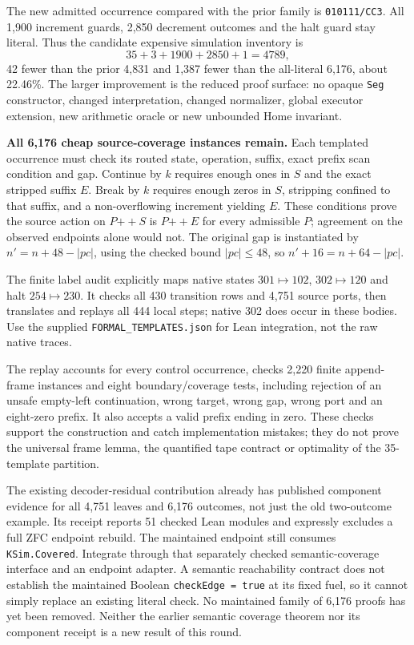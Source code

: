\documentclass[11pt]{article}
\newcommand{\code}[1]{\texttt{#1}}
\begin{document}
The new admitted occurrence compared with the prior family is \code{010111/CC3}. All 1,900 increment guards, 2,850 decrement outcomes and the halt guard stay literal. Thus the candidate expensive simulation inventory is
\[
 35+3+1900+2850+1=4789,
\]
42 fewer than the prior 4,831 and 1,387 fewer than the all-literal 6,176, about 22.46\%. The larger improvement is the reduced proof surface: no opaque \code{Seg} constructor, changed interpretation, changed normalizer, global executor extension, new arithmetic oracle or new unbounded Home invariant.

\textbf{All 6,176 cheap source-coverage instances remain.} Each templated occurrence must check its routed state, operation, suffix, exact prefix scan condition and gap. Continue by $k$ requires enough ones in $S$ and the exact stripped suffix $E$. Break by $k$ requires enough zeros in $S$, stripping confined to that suffix, and a non-overflowing increment yielding $E$. These conditions prove the source action on \(P\mathbin{+\!+}S\) is \(P\mathbin{+\!+}E\) for every admissible $P$; agreement on the observed endpoints alone would not. The original gap is instantiated by $n'=n+48-|pc|$, using the checked bound $|pc|\leq48$, so $n'+16=n+64-|pc|$.

The finite label audit explicitly maps native states $301\mapsto102$, $302\mapsto120$ and halt $254\mapsto230$. It checks all 430 transition rows and 4,751 source ports, then translates and replays all 444 local steps; native 302 does occur in these bodies. Use the supplied \code{FORMAL\_TEMPLATES.json} for Lean integration, not the raw native traces.

The replay accounts for every control occurrence, checks 2,220 finite append-frame instances and eight boundary/coverage tests, including rejection of an unsafe empty-left continuation, wrong target, wrong gap, wrong port and an eight-zero prefix. It also accepts a valid prefix ending in zero. These checks support the construction and catch implementation mistakes; they do not prove the universal frame lemma, the quantified tape contract or optimality of the 35-template partition.

The existing decoder-residual contribution already has published component evidence for all 4,751 leaves and 6,176 outcomes, not just the old two-outcome example. Its receipt reports 51 checked Lean modules and expressly excludes a full ZFC endpoint rebuild. The maintained endpoint still consumes \code{KSim.Covered}. Integrate through that separately checked semantic-coverage interface and an endpoint adapter. A semantic reachability contract does not establish the maintained Boolean \code{checkEdge = true} at its fixed fuel, so it cannot simply replace an existing literal check. No maintained family of 6,176 proofs has yet been removed. Neither the earlier semantic coverage theorem nor its component receipt is a new result of this round.
\end{document}
